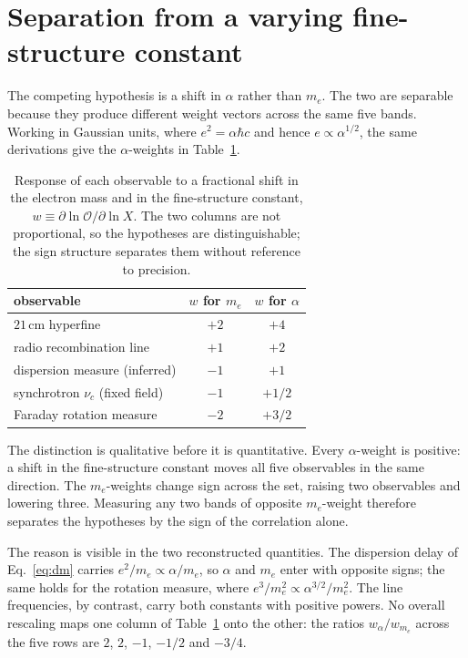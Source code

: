 \documentclass[aps,prd,twocolumn,superscriptaddress,nofootinbib,10pt]{revtex4-2}
\begin{document}
\section{Separation from a varying fine-structure constant}\label{sec:alpha}

The competing hypothesis is a shift in $\alpha$ rather than $m_e$. The two are separable because
they produce different weight vectors across the same five bands. Working in Gaussian units, where
$e^{2} = \alpha \hbar c$ and hence $e \propto \alpha^{1/2}$, the same derivations give the
$\alpha$-weights in Table~\ref{tab:weights}.

\begin{table}[t]
\caption{Response of each observable to a fractional shift in the electron mass and in the
fine-structure constant, $w \equiv \partial \ln \mathcal{O} / \partial \ln X$. The two columns are
not proportional, so the hypotheses are distinguishable; the sign structure separates them without
reference to precision.}
\label{tab:weights}
\begin{ruledtabular}
\begin{tabular}{lcc}
observable & $w$ for $m_e$ & $w$ for $\alpha$ \\
\hline
$21\,$cm hyperfine          & $+2$ & $+4$   \\
radio recombination line    & $+1$ & $+2$   \\
dispersion measure (inferred) & $-1$ & $+1$   \\
synchrotron $\nu_c$ (fixed field) & $-1$ & $+1/2$ \\
Faraday rotation measure    & $-2$ & $+3/2$ \\
\end{tabular}
\end{ruledtabular}
\end{table}

The distinction is qualitative before it is quantitative. Every $\alpha$-weight is positive: a
shift in the fine-structure constant moves all five observables in the same direction. The
$m_e$-weights change sign across the set, raising two observables and lowering three. Measuring any
two bands of opposite $m_e$-weight therefore separates the hypotheses by the sign of the
correlation alone.

The reason is visible in the two reconstructed quantities. The dispersion delay of
Eq.~\eqref{eq:dm} carries $e^{2}/m_e \propto \alpha/m_e$, so $\alpha$ and $m_e$ enter with opposite
signs; the same holds for the rotation measure, where $e^{3}/m_e^{2} \propto \alpha^{3/2}/m_e^{2}$.
The line frequencies, by contrast, carry both constants with positive powers. No overall rescaling
maps one column of Table~\ref{tab:weights} onto the other: the ratios $w_\alpha / w_{m_e}$ across
the five rows are $2$, $2$, $-1$, $-1/2$ and $-3/4$.
\end{document}
